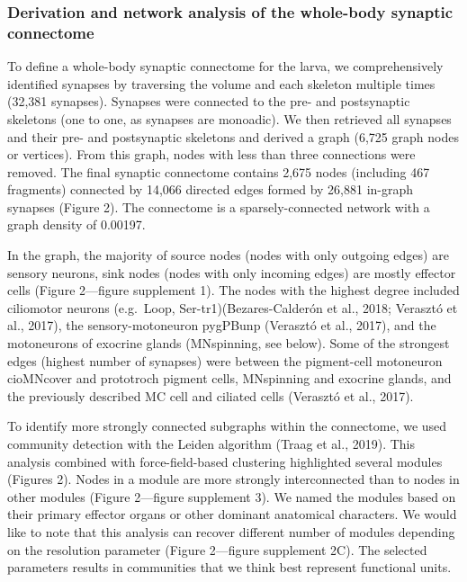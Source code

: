 \documentclass[
  11pt,
]{article}
\begin{document}
\subsubsection{Derivation and network analysis of the whole-body
synaptic
connectome}\label{derivation-and-network-analysis-of-the-whole-body-synaptic-connectome}

To define a whole-body synaptic connectome for the larva, we
comprehensively identified synapses by traversing the volume and each
skeleton multiple times (32,381 synapses). Synapses were connected to
the pre- and postsynaptic skeletons (one to one, as synapses are
monoadic). We then retrieved all synapses and their pre- and
postsynaptic skeletons and derived a graph (6,725 graph nodes or
vertices). From this graph, nodes with less than three connections were
removed. The final synaptic connectome contains 2,675 nodes (including
467 fragments) connected by 14,066 directed edges formed by 26,881
in-graph synapses (Figure 2). The connectome is a sparsely-connected
network with a graph density of 0.00197.

In the graph, the majority of source nodes (nodes with only outgoing
edges) are sensory neurons, sink nodes (nodes with only incoming edges)
are mostly effector cells (Figure 2---figure supplement 1). The nodes
with the highest degree included ciliomotor neurons (e.g.~Loop,
Ser-tr1)(Bezares-Calderón et al., 2018; Verasztó et al., 2017), the
sensory-motoneuron pygPBunp (Verasztó et al., 2017), and the motoneurons
of exocrine glands (MNspinning, see below). Some of the strongest edges
(highest number of synapses) were between the pigment-cell motoneuron
cioMNcover and prototroch pigment cells, MNspinning and exocrine glands,
and the previously described MC cell and ciliated cells (Verasztó et
al., 2017).

To identify more strongly connected subgraphs within the connectome, we
used community detection with the Leiden algorithm (Traag et al., 2019).
This analysis combined with force-field-based clustering highlighted
several modules (Figures 2). Nodes in a module are more strongly
interconnected than to nodes in other modules (Figure 2---figure
supplement 3). We named the modules based on their primary effector
organs or other dominant anatomical characters. We would like to note
that this analysis can recover different number of modules depending on
the resolution parameter (Figure 2---figure supplement 2C). The selected
parameters results in communities that we think best represent
functional units.
\end{document}
